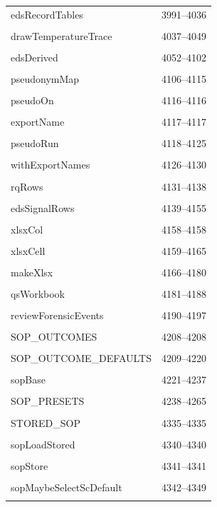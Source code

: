 {\begin{longtable}{@{}p{11cm}r@{}}
edsRecordTables & 3991--4036 \\\\\hline
drawTemperatureTrace & 4037--4049 \\\\\hline
edsDerived & 4052--4102 \\\\\hline
pseudonymMap & 4106--4115 \\\\\hline
pseudoOn & 4116--4116 \\\\\hline
exportName & 4117--4117 \\\\\hline
pseudoRun & 4118--4125 \\\\\hline
withExportNames & 4126--4130 \\\\\hline
rqRows & 4131--4138 \\\\\hline
edsSignalRows & 4139--4155 \\\\\hline
xlsxCol & 4158--4158 \\\\\hline
xlsxCell & 4159--4165 \\\\\hline
makeXlsx & 4166--4180 \\\\\hline
qsWorkbook & 4181--4188 \\\\\hline
reviewForensicEvents & 4190--4197 \\\\\hline
SOP\_OUTCOMES & 4208--4208 \\\\\hline
SOP\_OUTCOME\_DEFAULTS & 4209--4220 \\\\\hline
sopBase & 4221--4237 \\\\\hline
SOP\_PRESETS & 4238--4265 \\\\\hline
STORED\_SOP & 4335--4335 \\\\\hline
sopLoadStored & 4340--4340 \\\\\hline
sopStore & 4341--4341 \\\\\hline
sopMaybeSelectScDefault & 4342--4349 \\\\\hline

\end{longtable}}
